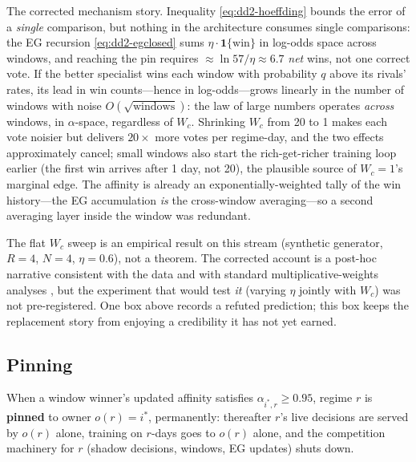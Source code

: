 The corrected mechanism story. Inequality \eqref{eq:dd2-hoeffding} bounds the
error of a \emph{single} comparison, but nothing in the architecture consumes
single comparisons: the EG recursion \eqref{eq:dd2-egclosed} sums
$\eta \cdot \mathbf{1}\{\text{win}\}$ in log-odds space across windows, and
reaching the pin requires $\approx \ln 57 / \eta \approx 6.7$ \emph{net}
wins, not one correct vote. If the better specialist wins each window with
probability $q$ above its rivals' rates, its lead in win counts---hence in
log-odds---grows linearly in the number of windows with noise
$O(\sqrt{\text{windows}})$: the law of large numbers operates \emph{across}
windows, in $\alpha$-space, regardless of $W_c$. Shrinking $W_c$ from 20 to 1
makes each vote noisier but delivers $20\times$ more votes per regime-day,
and the two effects approximately cancel; small windows also start the
rich-get-richer training loop earlier (the first win arrives after 1 day, not
20), the plausible source of $W_c = 1$'s marginal edge. The affinity is
already an exponentially-weighted tally of the win history---the EG
accumulation \emph{is} the cross-window averaging---so a second averaging
layer inside the window was redundant.

\begin{warning}[title={Do not quietly upgrade the corrected story to a prediction}]
The flat $W_c$ sweep is an empirical result on this stream (synthetic
generator, $R = 4$, $N = 4$, $\eta = 0.6$), not a theorem. The corrected
account is a post-hoc narrative consistent with the data and with standard
multiplicative-weights analyses
\citep{freund1997decision, arora2012multiplicative}, but the experiment that
would test \emph{it} (varying $\eta$ jointly with $W_c$) was not
pre-registered. One box above records a refuted prediction; this box keeps
the replacement story from enjoying a credibility it has not yet earned.
\end{warning}

\subsection{Pinning}
\label{sec:dd2-pinning}

\begin{definition}[Pin]
\label{def:dd2-pin}
When a window winner's updated affinity satisfies
$\alpha_{i^{*}, r} \ge 0.95$, regime $r$ is \textbf{pinned} to owner
$o(r) = i^{*}$, permanently: thereafter $r$'s live decisions are served by
$o(r)$ alone, training on $r$-days goes to $o(r)$ alone, and the competition
machinery for $r$ (shadow decisions, windows, EG updates) shuts down.
\end{definition}

